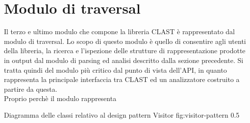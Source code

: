 \section{Modulo di traversal}

Il terzo e ultimo modulo che compone la libreria CLAST è rappresentato dal
modulo di traversal. Lo scopo di questo modulo è quello di consentire agli
utenti della libreria, la ricerca e l'ispezione delle strutture di
rappresentazione prodotte in output dal modulo di parsing ed analisi descritto
dalla sezione precedente. Si tratta quindi del modulo più critico dal punto di
vista dell'API, in quanto rappresenta la principale interfaccia tra CLAST ed
un analizzatore costruito a partire da questa.\\

Proprio perchè il modulo rappresenta

      {Diagramma delle classi relativo al design pattern Visitor}
      {fig:visitor-pattern}
      {0.5}




